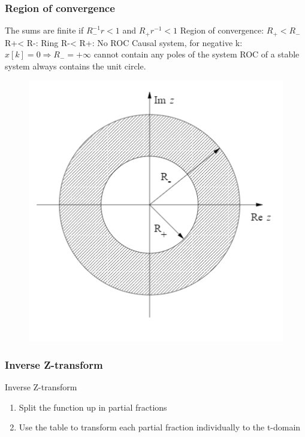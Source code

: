 \begin{frame}
\frametitle{Region of convergence}
The sums are finite if $R_{-}^{-1}r < 1$ and $R_{+}r^{-1} < 1$
Region of convergence: $R_{+} < R_{-}$
R+< R-: Ring
R-< R+: No ROC
Causal system, for negative k:
$x[k] = 0 \Rightarrow R_{-} = + \infty$
cannot contain any poles of the system
ROC of a stable system always contains
the unit circle.
\begin{figure}
\centering
\includegraphics[height=0.5\textheight]{Images/discrete_time_systems_24}
\label{fig:discrete_time_systems_24}
\end{figure}

\end{frame}
\begin{frame}
	\frametitle{Inverse Z-transform}
	\begin{block}{Inverse Z-transform}
		\begin{enumerate}
			\item Split the function up in partial fractions
			\item Use the table to transform each partial fraction individually to the t-domain
		\end{enumerate}
	\end{block}
	
\end{frame}
